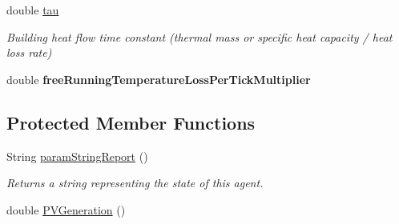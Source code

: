 \begin{DoxyCompactItemize}
\item 
\hypertarget{classuk_1_1ac_1_1dmu_1_1iesd_1_1cascade_1_1agents_1_1prosumers_1_1_household_prosumer_a9b1926ad4b32998e57a750463099e955}{double \hyperlink{classuk_1_1ac_1_1dmu_1_1iesd_1_1cascade_1_1agents_1_1prosumers_1_1_household_prosumer_a9b1926ad4b32998e57a750463099e955}{tau}}\label{classuk_1_1ac_1_1dmu_1_1iesd_1_1cascade_1_1agents_1_1prosumers_1_1_household_prosumer_a9b1926ad4b32998e57a750463099e955}

\begin{DoxyCompactList}\small\item\em Building heat flow time constant (thermal mass or specific heat capacity / heat loss rate) \end{DoxyCompactList}\item 
\hypertarget{classuk_1_1ac_1_1dmu_1_1iesd_1_1cascade_1_1agents_1_1prosumers_1_1_household_prosumer_ac678610fc0b2c8d42cdd3dac38b2c844}{double {\bfseries free\-Running\-Temperature\-Loss\-Per\-Tick\-Multiplier}}\label{classuk_1_1ac_1_1dmu_1_1iesd_1_1cascade_1_1agents_1_1prosumers_1_1_household_prosumer_ac678610fc0b2c8d42cdd3dac38b2c844}

\end{DoxyCompactItemize}
\subsection*{Protected Member Functions}
\begin{DoxyCompactItemize}
\item 
String \hyperlink{classuk_1_1ac_1_1dmu_1_1iesd_1_1cascade_1_1agents_1_1prosumers_1_1_household_prosumer_a6c01e1421c8fd8956499b50fd8ab95af}{param\-String\-Report} ()
\begin{DoxyCompactList}\small\item\em Returns a string representing the state of this agent. \end{DoxyCompactList}\item 
double \hyperlink{classuk_1_1ac_1_1dmu_1_1iesd_1_1cascade_1_1agents_1_1prosumers_1_1_household_prosumer_aa588d64b983f6a8835253a68cd4e5b4e}{P\-V\-Generation} ()
\end{DoxyCompactItemize}
